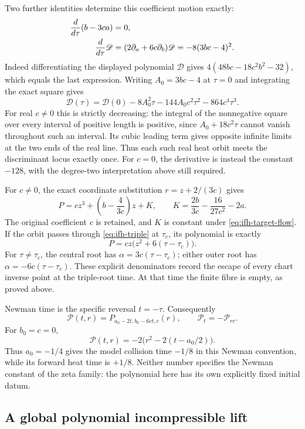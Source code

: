 Two further identities determine this coefficient motion exactly:
\begin{align}
 \frac{d}{d\tau}(b-3ca)&=0,\notag\\
 \frac{d}{d\tau}\mathscr D
 &=(2\partial_a+6c\partial_b)\mathscr D
 =-8(3bc-4)^2. \label{eq:ifh-discriminant-flow}
\end{align}
Indeed differentiating the displayed polynomial $\mathscr D$ gives
$4(48bc-18c^2b^2-32)$, which equals the last expression.
Writing $A_0=3bc-4$ at $\tau=0$ and integrating the exact square gives
\[
 \mathscr D(\tau)=\mathscr D(0)
 -8A_0^2\tau-144A_0c^2\tau^2-864c^4\tau^3.
\]
For real $c\ne0$ this is strictly decreasing: the integral of the
nonnegative square over every interval of positive length is positive,
since $A_0+18c^2\tau$ cannot vanish throughout such an interval.
Its cubic leading term gives opposite infinite limits at the two ends
of the real line. Thus each such real heat orbit meets the discriminant
locus exactly once. For $c=0$, the derivative is instead the constant
$-128$, with the degree-two interpretation above still required.

For $c\ne0$, the exact coordinate substitution $r=z+2/(3c)$ gives
\[
 P=cz^3+\left(b-\frac4{3c}\right)z+K,\qquad
 K=\frac{2b}{3c}-\frac{16}{27c^2}-2a.
\]
The original coefficient $c$ is retained, and $K$ is constant under
\eqref{eq:ifh-target-flow}. If the orbit passes through
\eqref{eq:ifh-triple} at $\tau_c$, its polynomial is exactly
\[
 P=c z\bigl(z^2+6(\tau-\tau_c)\bigr).
\]
For $\tau\ne\tau_c$, the central root has
$\alpha=3c(\tau-\tau_c)$; either outer root has
$\alpha=-6c(\tau-\tau_c)$. These explicit denominators record the
escape of every chart inverse point at the triple-root time.
At that time the finite fibre is empty, as proved above.

Newman time is the specific reversal $t=-\tau$. Consequently
\[
 \mathcal P(t,r)=P_{a_0-2t,b_0-6ct,c}(r),\qquad
 \mathcal P_t=-\mathcal P_{rr}.
\]
For $b_0=c=0$,
\[
 \mathcal P(t,r)=-2\bigl(r^2-2(t-a_0/2)\bigr).
\]
Thus $a_0=-1/4$ gives the model collision time $-1/8$ in this
Newman convention, while its forward heat time is $+1/8$.
Neither number specifies the Newman constant of the zeta family:
the polynomial here has its own explicitly fixed initial datum.

\subsection{A global polynomial incompressible lift}

